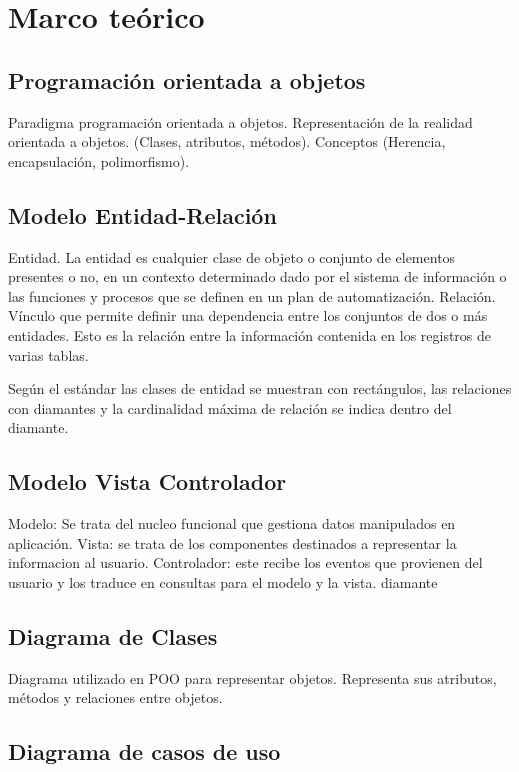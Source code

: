 \chapter{Marco teórico}

\section{Programación orientada a objetos}

Paradigma programación orientada a objetos.
Representación de la realidad orientada a objetos. (Clases, atributos, métodos).
Conceptos (Herencia, encapsulación, polimorfismo).

\section{Modelo Entidad-Relación}

Entidad. La entidad es cualquier clase de objeto o conjunto de elementos presentes o no, en un contexto determinado dado por el sistema de información o las funciones y procesos que se definen en un plan de automatización.
Relación. Vínculo que permite definir una dependencia entre los conjuntos de dos o más entidades. Esto es la relación entre la información contenida en los registros de varias tablas.

Según el estándar las clases de entidad se muestran con rectángulos, las relaciones con diamantes  y la cardinalidad máxima de relación se indica dentro del diamante.

\section{Modelo Vista Controlador}

Modelo: Se trata del nucleo funcional que gestiona datos manipulados en aplicación.
Vista: se trata de los componentes destinados a representar la informacion al usuario.
Controlador: este recibe los eventos que provienen del usuario y los traduce en consultas para el modelo y la vista. diamante

\section{Diagrama de Clases}

Diagrama utilizado en POO para representar objetos. Representa sus atributos, métodos y relaciones entre objetos.

\section{Diagrama de casos de uso}

